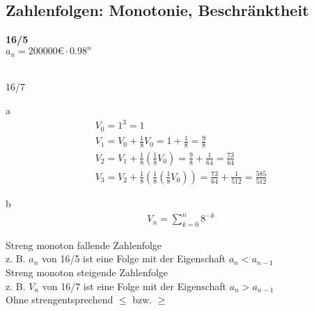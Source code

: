 \subsection{Zahlenfolgen: Monotonie, Beschränktheit}
\begin{onepage}
  \textbf{16/5}\\
  $a_n = 200000€ \cdot 0.98^n$ \\\\
\end{onepage}
\begin{exercise}{16/7}
  \item [a]
  \begin{gather*}
    V_0 = 1^3 = 1 \\
    V_1 = V_0 + \frac{1}{8} V_0 = 1 + \frac{1}{8} = \frac{9}{8} \\
    V_2 = V_1 + \frac{1}{8}(\frac{1}{8} V_0) = \frac{9}{8} + \frac{1}{64} = \frac{73}{64} \\
    V_3 = V_2 + \frac{1}{8}(\frac{1}{8}(\frac{1}{8} V_0)) = \frac{73}{64} + \frac{1}{512} = \frac{585}{512}
  \end{gather*}
  \item [b] 
  \begin{gather*}
    V_n = \sum^n_{k = 0} 8^{-k}
  \end{gather*}
\end{exercise}
\begin{onepage}
  Streng monoton fallende Zahlenfolge \\
  \;z. B. $a_n$ von 16/5 ist eine Folge mit der Eigenschaft $a_n < a_{n - 1}$ \\
  Streng monoton steigende Zahlenfolge \\
  \;z. B. $V_n$ von 16/7 ist eine Folge mit der Eigenschaft $a_n > a_{n - 1}$ \\
  Ohne \glqq streng\grqq entsprechend $\leq$ bzw. $\geq$
\end{onepage} \\\\

